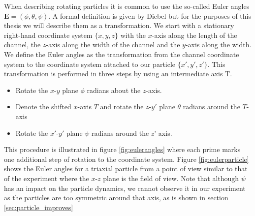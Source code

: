 When describing rotating particles it is common to use the so-called Euler angles $\mathbf{E} = (\phi, \theta, \psi)$. A formal definition is given by Diebel \cite{Euler} but for the purposes of this thesis we will describe them as a transformation. We start with a stationary right-hand coordinate system $\{x,y,z\}$ with the $x$-axis along the length of the channel, the $z$-axis along the width of the channel and the $y$-axis along the width. We define the Euler angles as the transformation from the channel coordinate system to the coordinate system attached to our particle $\{x',y',z'\}$. This transformation is performed in three steps by using an intermediate axis T.

\begin{itemize}
\item Rotate the $x$-$y$ plane $\phi$ radians about the $z$-axis.
\item Denote the shifted $x$-axis $T$ and rotate the $z$-$y'$ plane $\theta$ radians around the $T$-axis
\item Rotate the $x'$-$y'$ plane $\psi$ radians around the $z$' axis.
\end{itemize}

This procedure is illustrated in figure \ref{fig:eulerangles} where each prime marks one additional step of rotation to the coordinate system. Figure \ref{fig:eulerparticle} shows the Euler angles for a triaxial particle from a point of view similar to that of the experiment where the $x$-$z$ plane is the field of view. Note that although $\psi$ has an impact on the particle dynamics, we cannot observe it in our experiment as the particles are too symmetric around that axis, as is shown in section \ref{sec:particle_improves}


